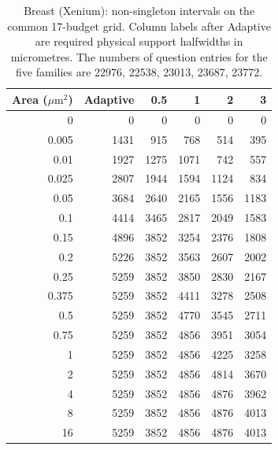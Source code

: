 \begin{table}[ht]\centering
\begin{tabular}{rrrrrr}\toprule
Area ($\mu\mathrm m^2$)&Adaptive&0.5&1&2&3\\\midrule
0 & 0 & 0 & 0 & 0 & 0\\
0.005 & 1431 & 915 & 768 & 514 & 395\\
0.01 & 1927 & 1275 & 1071 & 742 & 557\\
0.025 & 2807 & 1944 & 1594 & 1124 & 834\\
0.05 & 3684 & 2640 & 2165 & 1556 & 1183\\
0.1 & 4414 & 3465 & 2817 & 2049 & 1583\\
0.15 & 4896 & 3852 & 3254 & 2376 & 1808\\
0.2 & 5226 & 3852 & 3563 & 2607 & 2002\\
0.25 & 5259 & 3852 & 3850 & 2830 & 2167\\
0.375 & 5259 & 3852 & 4411 & 3278 & 2508\\
0.5 & 5259 & 3852 & 4770 & 3545 & 2711\\
0.75 & 5259 & 3852 & 4856 & 3951 & 3054\\
1 & 5259 & 3852 & 4856 & 4225 & 3258\\
2 & 5259 & 3852 & 4856 & 4814 & 3670\\
4 & 5259 & 3852 & 4856 & 4876 & 3962\\
8 & 5259 & 3852 & 4856 & 4876 & 4013\\
16 & 5259 & 3852 & 4856 & 4876 & 4013\\
\bottomrule\end{tabular}
\caption{Breast (Xenium): non-singleton intervals on the common 17-budget grid. Column labels after Adaptive are required physical support halfwidths in micrometres. The numbers of question entries for the five families are 22976, 22538, 23013, 23687, 23772.}
\end{table}
